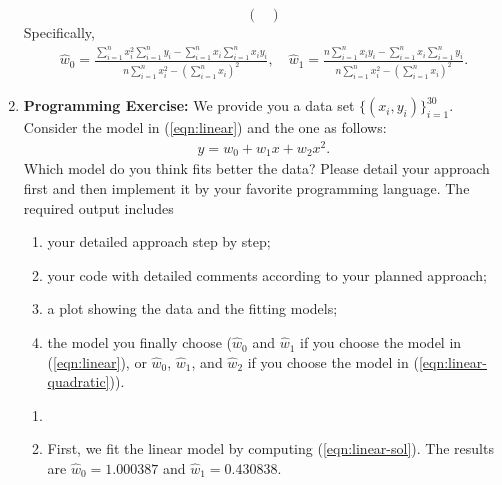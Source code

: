 \begin{exercise}
\begin{enumerate}
\begin{solution}
$$\begin{pmatrix}
                    \end{pmatrix}
                $$
                Specifically, 
                \begin{align}\label{eqn:linear-sol}
                    \hat{w}_0 = \frac{\sum\limits_{i=1}^n x_i^2 \sum\limits_{i=1}^n y_i - \sum\limits_{i=1}^n x_i \sum\limits_{i=1}^n x_iy_i}{n\sum\limits_{i=1}^n x_i^2-\left(\sum\limits_{i=1}^n x_i\right)^2}, \quad 
                    \hat{w}_1 = \frac{n \sum\limits_{i=1}^n x_iy_i - \sum\limits_{i=1}^n x_i \sum\limits_{i=1}^n y_i}{n\sum\limits_{i=1}^n x_i^2-\left(\sum\limits_{i=1}^n x_i\right)^2}.
                \end{align}
                \qedhere
            \end{solution}
            
        \item \textbf{Programming Exercise:} We provide you a data set $\{ (x_i ,y_i) \}_{i=1}^{30}$. Consider the model in (\ref{eqn:linear}) and the one as follows:
            \begin{align}\label{eqn:linear-quadratic}
                y =  w_0 + w_1 x+ w_2 x^2.
            \end{align}
            Which model do you think fits better the data? Please detail your approach first and then implement it by your favorite programming language. The required output includes
            \begin{enumerate}
                \item your detailed approach step by step;
                \item your code with detailed comments according to your planned approach;
                \item a plot showing the data and the fitting models;
                \item the model you finally choose ($\hat{w}_0$ and $\hat{w}_1$ if you choose the model in (\ref{eqn:linear}), or $\hat{w}_0$, $\hat{w}_1$, and $\hat{w}_2$ if you choose the model in (\ref{eqn:linear-quadratic})).
            \end{enumerate}
            
            \begin{solution}
                \begin{enumerate}
                    \item []
                    \item First, we fit the linear model by computing (\ref{eqn:linear-sol}). The results are $\hat{w}_0 = 1.000387$ and $\hat{w}_1 = 0.430838$.
                        

\end{enumerate}
\end{solution}
\end{enumerate}
\end{exercise}
